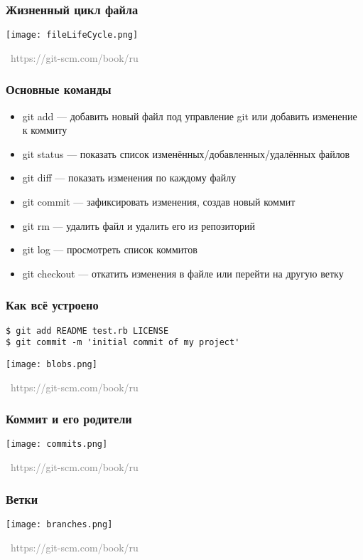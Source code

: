 \documentclass[xetex,mathserif,serif]{beamer}
\newcommand{\attribution}[1] {
	\vspace{-5mm}\begin{flushright}\begin{scriptsize}\textcolor{gray}{\textcopyright\, #1}\end{scriptsize}\end{flushright}
}
\begin{document}
	\begin{frame}
		\frametitle{Жизненный цикл файла}
		\begin{center}
			\texttt{[image: fileLifeCycle.png]}
			\attribution{https://git-scm.com/book/ru}
		\end{center}
	\end{frame}

	\begin{frame}
		\frametitle{Основные команды}
		\begin{itemize}
			\item git add --- добавить новый файл под управление git или добавить изменение к коммиту
			\item git status --- показать список изменённых/добавленных/удалённых файлов
			\item git diff --- показать изменения по каждому файлу
			\item git commit --- зафиксировать изменения, создав новый коммит
			\item git rm --- удалить файл и удалить его из репозиторий
			\item git log --- просмотреть список коммитов
			\item git checkout --- откатить изменения в файле или перейти на другую ветку
		\end{itemize}
	\end{frame}

	\begin{frame}[fragile]
		\frametitle{Как всё устроено}
		\begin{verbatim}
$ git add README test.rb LICENSE
$ git commit -m 'initial commit of my project'
		\end{verbatim}
		\begin{center}
			\texttt{[image: blobs.png]}
			\attribution{https://git-scm.com/book/ru}
		\end{center}
	\end{frame}

	\begin{frame}
		\frametitle{Коммит и его родители}
		\begin{center}
			\texttt{[image: commits.png]}
			\attribution{https://git-scm.com/book/ru}
		\end{center}
	\end{frame}

	\begin{frame}
		\frametitle{Ветки}
		\begin{center}
			\texttt{[image: branches.png]}
			\attribution{https://git-scm.com/book/ru}
		\end{center}
	\end{frame}
\end{document}
